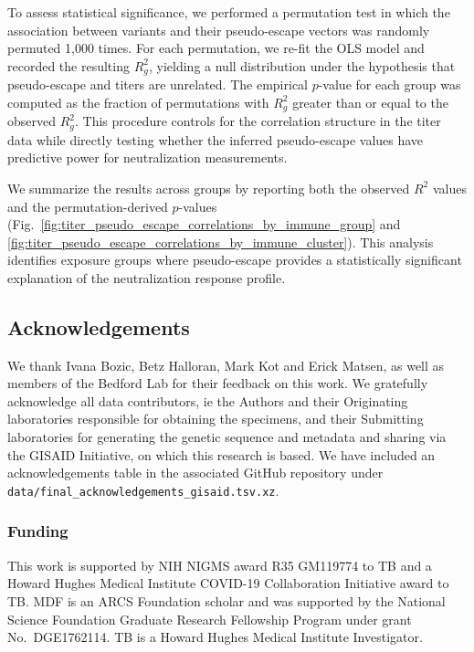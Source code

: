 \documentclass[11pt,oneside,letterpaper]{article}
\begin{document}
To assess statistical significance, we performed a permutation test in which the association between variants and their pseudo-escape vectors was randomly permuted 1,000 times.
For each permutation, we re-fit the OLS model and recorded the resulting $R^2_g$, yielding a null distribution under the hypothesis that pseudo-escape and titers are unrelated.
The empirical $p$-value for each group was computed as the fraction of permutations with $R^2_g$ greater than or equal to the observed $R^2_g$.
This procedure controls for the correlation structure in the titer data while directly testing whether the inferred pseudo-escape values have predictive power for neutralization measurements.

We summarize the results across groups by reporting both the observed $R^2$ values and the permutation-derived $p$-values (Fig.~\ref{fig:titer_pseudo_escape_correlations_by_immune_group} and \ref{fig:titer_pseudo_escape_correlations_by_immune_cluster}).
This analysis identifies exposure groups where pseudo-escape provides a statistically significant explanation of the neutralization response profile.

\subsection*{Acknowledgements}

We thank Ivana Bozic, Betz Halloran, Mark Kot and Erick Matsen, as well as members of the Bedford Lab for their feedback on this work.
We gratefully acknowledge all data contributors, ie the Authors and their Originating
laboratories responsible for obtaining the specimens, and their Submitting laboratories for generating the genetic sequence and metadata and sharing via the GISAID Initiative, on which this research is based.
We have included an acknowledgements table in the associated GitHub repository under \texttt{data/final\_acknowledgements\_gisaid.tsv.xz}.

\subsubsection*{Funding}

This work is supported by NIH NIGMS award R35 GM119774 to TB and a Howard Hughes Medical Institute COVID-19 Collaboration Initiative award to TB.
MDF is an ARCS Foundation scholar and was supported by the National Science Foundation Graduate Research Fellowship Program under grant No.\ DGE1762114.
TB is a Howard Hughes Medical Institute Investigator.
\end{document}
